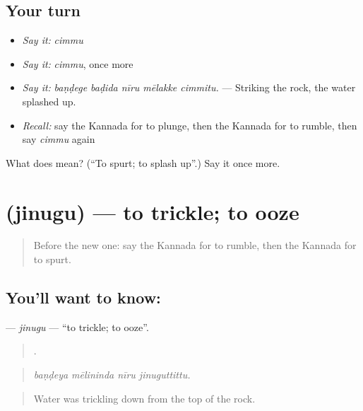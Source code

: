 \subsection*{Your turn}
\begin{itemize}
\raggedright
  \item \emph{Say it:} \emph{cimmu}
  \item \emph{Say it:} \emph{cimmu}, once more
  \item \emph{Say it:} \emph{baṇḍege baḍida nīru mēlakke cimmitu.} — Striking the rock, the water splashed up.
  \item \emph{Recall:} say the Kannada for to plunge, then the Kannada for to rumble, then say \emph{cimmu} again
\end{itemize}

\begin{tcolorbox}[breakable,colback=teal!4,colframe=teal!35!black,title={Before you move on}]
What does  mean? (\textquotedblleft{}To spurt; to splash up\textquotedblright{}.) Say it once more.
\end{tcolorbox}
\section[\texorpdfstring{\kn{ಜಿನುಗು} (jinugu)}{ಜಿನುಗು (jinugu)}]{ (jinugu) — to trickle; to ooze}

\label{lesson:KA-C482-jinugu}



\begin{quote}
Before the new one: say the Kannada for to rumble, then the Kannada for to spurt.
\end{quote}

\subsection*{You'll want to know: }
\textbf{} — \emph{jinugu} — \textquotedblleft{}to trickle; to ooze\textquotedblright{}.

\begin{quote}
   .
\end{quote}

\begin{quote}
\emph{baṇḍeya mēlininda nīru jinuguttittu.}
\end{quote}

\begin{quote}
Water was trickling down from the top of the rock.
\end{quote}

